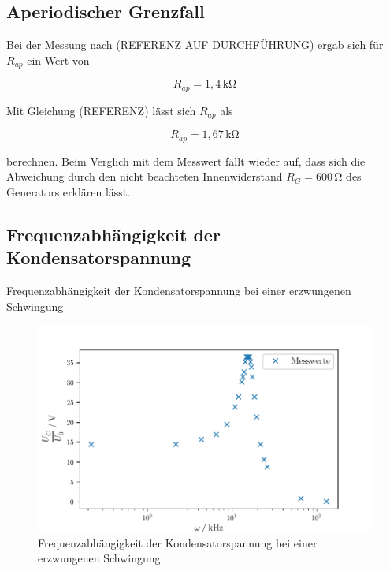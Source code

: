 \subsection{Aperiodischer Grenzfall}
Bei der Messung nach (REFERENZ AUF DURCHFÜHRUNG)
ergab sich für $R_{ap}$ ein Wert von

\begin{equation*}
  R_{ap}=1,4\,\si{\kilo\ohm}
\end{equation*}

Mit Gleichung (REFERENZ) lässt sich $R_{ap}$ 
als

\begin{equation*}
  R_{ap}=1,67\,\si{\kilo\ohm}
\end{equation*}

berechnen. Beim Verglich mit dem Messwert fällt wieder 
auf, dass sich die Abweichung durch den nicht beachteten
Innenwiderstand $R_G=600\,\si{\ohm}$ des Generators erklären lässt.




\subsection{Frequenzabhängigkeit der Kondensatorspannung}

\begin{table}[H]
  \centering
  
  
  \caption{Frequenzabhängigkeit der Kondensatorspannung bei einer erzwungenen Schwingung}
  \label{tab:b}
\end{table}

\begin{figure}[H]
  \centering
  \includegraphics{build/plot2.pdf}
  \caption{Frequenzabhängigkeit der Kondensatorspannung bei einer erzwungenen Schwingung}
  \label{fig:c}
\end{figure}


